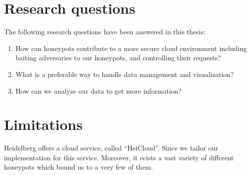 
\section{Research questions}

The following research questions have been answered in this thesis:

\begin{enumerate}
    \item How can honeypots contribute to a more secure cloud environment including baiting adversaries to our honeypots, and controlling their requests?
    \item What is a preferable way to handle data management and visualization?
    \item How can we analyze our data to get more information?
\end{enumerate}

\section{Limitations}

Heidelberg offers a cloud service, called \enquote{HeiCloud}.
Since  we tailor our implementation for this service.
Moreover, it ecists a vast variety of different honeypots which bound us to a very few of them. 